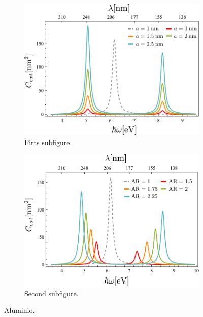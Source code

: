 \begin{figure}
	\centering
	\begin{subfigure}{0.49\textwidth}
		\includegraphics[width=\textwidth]{../../Figuras/AlAR}
		\caption{Firts subfigure.}
		\label{fig:first}
	\end{subfigure}
	\hfill
	\begin{subfigure}{0.49\textwidth}
		\includegraphics[width=\textwidth]{../../Figuras/Alc}
		\caption{Second subfigure.}
		\label{fig:second}
	\end{subfigure}
	
	\caption{Aluminio.}
	\label{fig:figures}
\end{figure}
